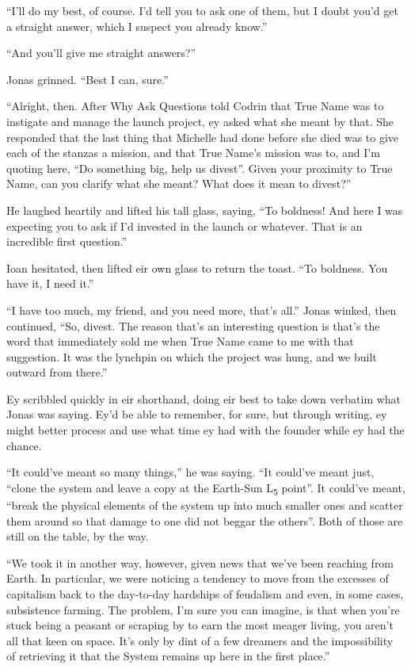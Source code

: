 ``I'll do my best, of course. I'd tell you to ask one of them, but I doubt you'd get a straight answer, which I suspect you already know.''

``And you'll give me straight answers?''

Jonas grinned. ``Best I can, sure.''

``Alright, then. After Why Ask Questions told Codrin that True Name was to instigate and manage the launch project, ey asked what she meant by that. She responded that the last thing that Michelle had done before she died was to give each of the stanzas a mission, and that True Name's mission was to, and I'm quoting here, ``Do something big, help us divest''. Given your proximity to True Name, can you clarify what she meant? What does it mean to divest?''

He laughed heartily and lifted his tall glass, saying, ``To boldness! And here I was expecting you to ask if I'd invested in the launch or whatever. That is an incredible first question.''

Ioan hesitated, then lifted eir own glass to return the toast. ``To boldness. You have it, I need it.''

``I have too much, my friend, and you need more, that's all.'' Jonas winked, then continued, ``So, divest. The reason that's an interesting question is that's the word that immediately sold me when True Name came to me with that suggestion. It was the lynchpin on which the project was hung, and we built outward from there.''

Ey scribbled quickly in eir shorthand, doing eir best to take down verbatim what Jonas was saying. Ey'd be able to remember, for sure, but through writing, ey might better process and use what time ey had with the founder while ey had the chance.

``It could've meant so many things,'' he was saying. ``It could've meant just, ``clone the system and leave a copy at the Earth-Sun L\textsubscript{5} point''. It could've meant, ``break the physical elements of the system up into much smaller ones and scatter them around so that damage to one did not beggar the others''. Both of those are still on the table, by the way.

``We took it in another way, however, given news that we've been reaching from Earth. In particular, we were noticing a tendency to move from the excesses of capitalism back to the day-to-day hardships of feudalism and even, in some cases, subsistence farming. The problem, I'm sure you can imagine, is that when you're stuck being a peasant or scraping by to earn the most meager living, you aren't all that keen on space. It's only by dint of a few dreamers and the impossibility of retrieving it that the System remains up here in the first place.''

